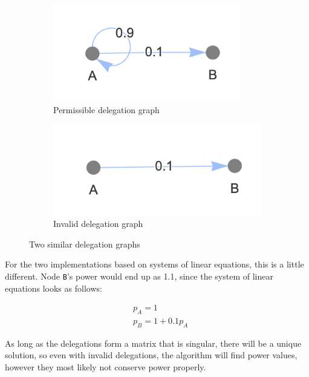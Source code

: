 \begin{figure}[h]
    \centering
    \begin{subfigure}[t]{0.45\textwidth}
	\centering
	\includegraphics[width=0.9\textwidth]{allowed_self_loop}
	\caption{Permissible delegation graph}
	\label{subfig:permissible-self-delegation}
    \end{subfigure}
    \hfill
    \begin{subfigure}[t]{0.45\textwidth}
        \centering
        \includegraphics[width=\textwidth]{invalid_delegation_graph}
        \caption{Invalid delegation graph}
         \label{subfig:invalid-delegation-graph} 
    \end{subfigure}
    \caption{Two similar delegation graphs}
    \label{fig:small-delegation-graphs}
\end{figure}

For the two implementations based on systems of linear equations, this is a little different. Node \texttt{B}'s power would end up as 1.1, since the system of linear equations looks as follows:

\begin{align*}
& p_A = 1 \\
& p_B = 1 + 0.1p_A
\end{align*}

As long as the delegations form a matrix that is singular, there will be a unique solution, so even with invalid delegations, the algorithm will find power values, however they most likely not conserve power properly. 

